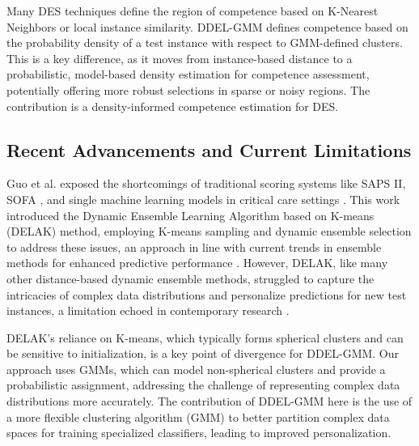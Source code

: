 \documentclass[lettersize,journal]{IEEEtran}
\newcommand{\greenhighlight}[1]{\textcolor{highlightgreen}{#1}}
\begin{document}
\greenhighlight{Many DES techniques define the region of competence based on K-Nearest Neighbors or local instance similarity. DDEL-GMM defines competence based on the probability density of a test instance with respect to GMM-defined clusters. This is a key difference, as it moves from instance-based distance to a probabilistic, model-based density estimation for competence assessment, potentially offering more robust selections in sparse or noisy regions. The contribution is a density-informed competence estimation for DES.}

\subsection{Recent Advancements and Current Limitations}
\noindent Guo et al. \cite{guo_dynamic_2021} exposed the shortcomings of traditional scoring systems like SAPS II, SOFA \cite{tekin_comparison_2024}, and single machine learning models in critical care settings \cite{sagi_ensemble_2018}. This work introduced the Dynamic Ensemble Learning Algorithm based on K-means (DELAK) method, employing K-means sampling and dynamic ensemble selection to address these issues, an approach in line with current trends in ensemble methods for enhanced predictive performance \cite{dong_survey_2020, jiang_clustering-based_2019}. However, DELAK, like many other distance-based dynamic ensemble methods, struggled to capture the intricacies of complex data distributions and personalize predictions for new test instances, a limitation echoed in contemporary research \cite{mienye_survey_2022, gonzalez_practical_2020}. 

\greenhighlight{DELAK's reliance on K-means, which typically forms spherical clusters and can be sensitive to initialization, is a key point of divergence for DDEL-GMM. Our approach uses GMMs, which can model non-spherical clusters and provide a probabilistic assignment, addressing the challenge of representing complex data distributions more accurately. The contribution of DDEL-GMM here is the use of a more flexible clustering algorithm (GMM) to better partition complex data spaces for training specialized classifiers, leading to improved personalization.}
\end{document}
